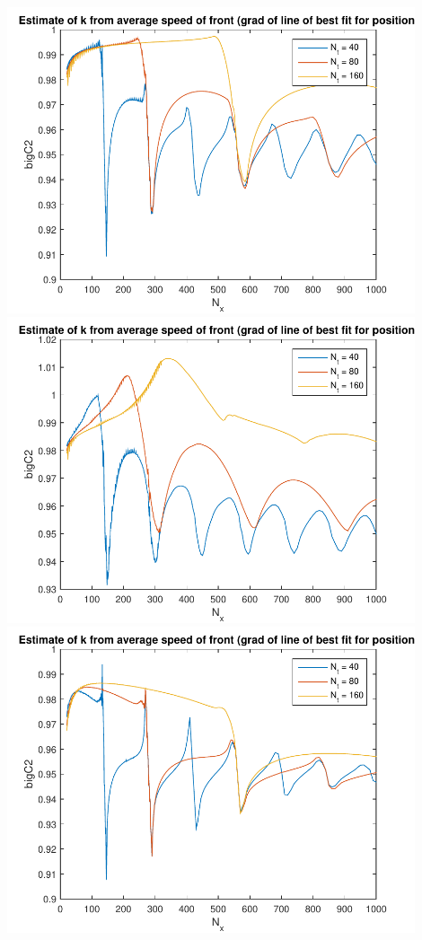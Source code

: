 \documentclass{article}
\begin{document}
\includegraphics[width=0.9\textwidth]{alan3-k.pdf}\\
\includegraphics[width=0.9\textwidth]{alan4-k.pdf}\\
\includegraphics[width=0.9\textwidth]{alan5-k.pdf}\\
\end{document}
